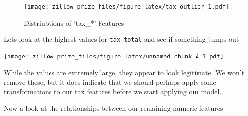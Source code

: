 \documentclass[]{book}
\newenvironment{Shaded}{\begin{snugshade}}{\end{snugshade}}
\newcommand{\KeywordTok}[1]{\textcolor[rgb]{0.13,0.29,0.53}{\textbf{#1}}}
\newcommand{\DataTypeTok}[1]{\textcolor[rgb]{0.13,0.29,0.53}{#1}}
\newcommand{\DecValTok}[1]{\textcolor[rgb]{0.00,0.00,0.81}{#1}}
\newcommand{\StringTok}[1]{\textcolor[rgb]{0.31,0.60,0.02}{#1}}
\newcommand{\OtherTok}[1]{\textcolor[rgb]{0.56,0.35,0.01}{#1}}
\newcommand{\OperatorTok}[1]{\textcolor[rgb]{0.81,0.36,0.00}{\textbf{#1}}}
\newcommand{\NormalTok}[1]{#1}
\theoremstyle{definition}
\theoremstyle{definition}
\theoremstyle{definition}
\theoremstyle{remark}
\begin{document}
\begin{figure}
\centering
\texttt{[image: zillow-prize\_files/figure-latex/tax-outlier-1.pdf]}
\caption{\label{fig:tax-outlier}Distriubtions of 'tax\_*' Features}
\end{figure}

Lets look at the highest values for \texttt{tax\_total} and see if
something jumps out

\begin{Shaded}
\end{Shaded}

\texttt{[image: zillow-prize\_files/figure-latex/unnamed-chunk-4-1.pdf]}

While the values are extremely large, they appear to look legitimate. We
won't remove these, but it does indicate that we should perhaps apply
some transformations to our tax features before we start applying our
model.

Now a look at the relationships between our remaining numeric features

\begin{Shaded}
\end{Shaded}
\end{document}
